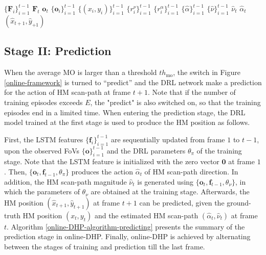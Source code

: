 \documentclass[10pt,journal,compsoc]{IEEEtran}
\begin{document}
$\{\mathbf{F}_i\}_{i=1}^{t-1}$
$\mathbf{F}_t$
$\mathbf{o}_t$
$\{\mathbf{o}_i\}_{i=1}^{t-1}$
$\{(x_i,y_i)\}_{i=1}^{t-1}$
$\{r_i^{\nu}\}_{i=1}^{t-1}$
$\{r_i^{\alpha}\}_{i=1}^{t-1}$
$\{\hat{\alpha}\}_{i=1}^{t-1}$
$\{\hat{\nu}\}_{i=1}^{t-1}$
$\hat{\nu}_t$
$\hat{\alpha}_t$
$(\hat{x}_{t+1},\hat{y}_{+1})$
\subsection{Stage II: Prediction}
When the average MO is larger than a threshold $th_{\text{mo}}$, the switch in Figure \ref{online-framework} is turned to ``predict'' and the DRL network make a prediction for the action of HM scan-path at frame $t+1$.
Note that if the number of training episodes exceeds $E$, the "predict" is also switched on, so that the training episodes end in a limited time.
When entering the prediction stage, the DRL model trained at the first stage is used to produce the HM position as follows.

First, the LSTM features $\{\mathbf{f}_i\}_{i=1}^{t-1}$ are sequentially updated from frame $1$ to $t-1$, upon the observed FoVs $\{\mathbf{o}\}_{i=1}^{t-1}$ and the DRL parameters $\theta_{\pi}$ of the training stage. Note that the LSTM feature is initialized with the zero vector $\mathbf{0}$ at frame $1$. Then, $\{\mathbf{o}_t, \mathbf{f}_{t-1}, \theta_{\pi}\}$ produces the action $\hat{\alpha}_t$ of HM scan-path direction. In addition, the HM scan-path magnitude $\hat{\nu}_t$ is generated using $\{\mathbf{o}_t, \mathbf{f}_{t-1}, \theta_{\nu}\}$, in which the parameters of $\theta_{\nu}$ are obtained at the training stage. Afterwards, the HM position $(\hat{x}_{t+1}, \hat{y}_{t+1})$ at frame $t+1$ can be predicted, given the ground-truth HM position $(\!x_{t}, \!y_{t}\!)$ and the estimated HM scan-path $(\hat{\alpha}_t, \hat{\nu}_t)$ at frame $t$. Algorithm \ref{online-DHP-algorithm-predicting} presents the summary of the prediction stage in online-DHP. Finally, online-DHP is achieved by alternating between the stages of training and prediction till the last frame.
\end{document}

